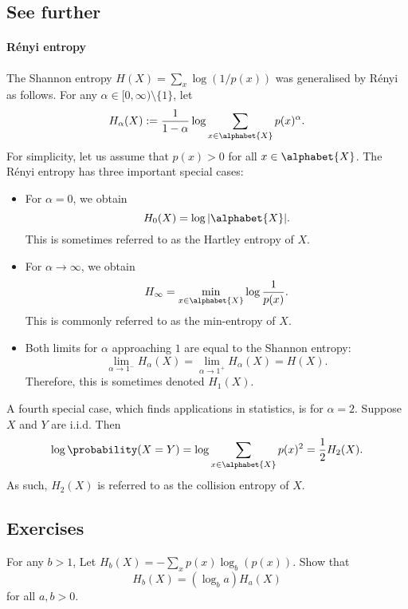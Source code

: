 \documentclass[a4paper, 11pt, openany]{book}
\begin{document}
\subsection{See further}


\paragraph{R\'enyi entropy} The Shannon entropy $H(X) = \sum_x \log (1/p(x))$ was generalised by R\'enyi as follows. For any $\alpha \in [0, \infty) \setminus \{1\}$, let
\[
    H_\alpha(X) := \frac{1}{1-\alpha} \log \sum_{x \in \alphabet{X}} p(x)^\alpha.
\]
For simplicity, let us assume that $p(x) > 0$ for all $x \in \alphabet{X}$. The R\'enyi entropy has three important special cases:
\begin{itemize}
    \item For $\alpha = 0$, we obtain
    \[
        H_0(X) = \log |\alphabet{X}|.
    \]
    This is sometimes referred to as the Hartley entropy of $X$.

    \item For $\alpha \to \infty$, we obtain
    \[
        H_\infty = \min_{x \in \alphabet{X}} \log \frac{1}{p(x)}.
    \]
    This is commonly referred to as the min-entropy of $X$.

    \item Both limits for $\alpha$ approaching $1$ are equal to the Shannon entropy:
    \[
        \lim_{\alpha \to 1^-} H_\alpha(X) = \lim_{\alpha \to 1^+} H_\alpha(X) = H(X).
    \]
    Therefore, this is sometimes denoted $H_1(X)$.
\end{itemize}

A fourth special case, which finds applications in statistics, is for $\alpha = 2$. Suppose $X$ and $Y$ are i.i.d. Then
\[
    \log \probability(X = Y) = \log \sum_{x \in \alphabet{X}} p(x)^2 = \frac{1}{2} H_2(X).
\]
As such, $H_2(X)$ is referred to as the collision entropy of $X$.

\subsection{Exercises}




\begin{exercise}
For any $b>1$, Let $H_b(X) = - \sum_x p(x) \log_b(p(x))$. Show that
$$
	H_b(X) = (\log_b a) H_a(X)
$$
for all $a,b > 0$.
\end{exercise}
\end{document}
